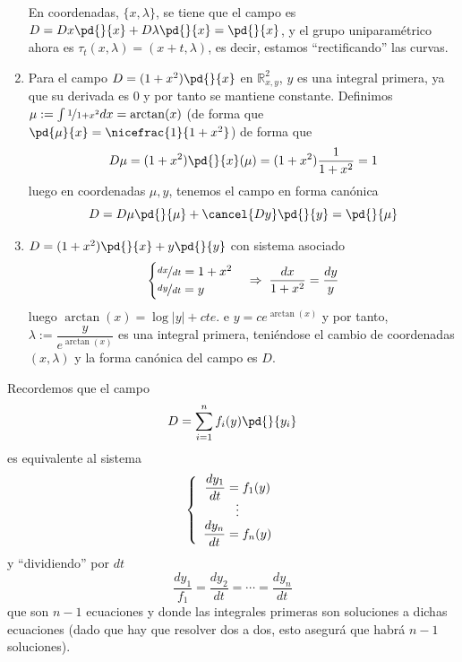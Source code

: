 \begin{eje}
\begin{enumerate}
            En coordenadas, $\{x, \lambda\}$, se tiene que el campo es $D=Dx\pd{}{x}+D\lambda \pd{}{x}=\pd{}{x}$, y el grupo uniparamétrico ahora es $\tau_t (x,\lambda)=(x+t, \lambda)$, es decir, estamos ``rectificando'' las curvas.

            \item Para el campo $D=(1+x^2)\pd{}{x}$ en $\mathbb R^2_{x,y}$, $y$ es una integral primera, ya que su derivada es 0 y por tanto se mantiene constante. Definimos $\mu:=\int \nicefrac{1}{1+x^2} dx = \arctan(x)$ (de forma que $\pd{\mu}{x}=\nicefrac{1}{1+x^2}$) de forma que 
            $$D\mu=(1+x^2)\pd{}{x}(\mu )=(1+x^2)\dfrac{1}{1+x^2}=1$$
            luego en coordenadas $\mu, y$, tenemos el campo en forma canónica
            $$D=D\mu\pd{}{\mu}+\cancel{Dy}\pd{}{y}=\pd{}{\mu}$$
            \item $D=(1+x^2)\pd{}{x}+y\pd{}{y}$ con sistema asociado
            $$\begin{cases}
                \nicefrac{dx}{dt}=1+x^2 \\ \nicefrac{dy}{dt}=y
            \end{cases}  \Rightarrow \; \dfrac{dx}{1+x^2}=\dfrac{dy}{y} $$
            luego $\arctan(x)=\log|y|+cte.$ e $y=c e^{\arctan (x)}$ y por tanto, $\lambda:=\dfrac{y}{e^{\arctan(x)}}$ es una integral primera, teniéndose el cambio de coordenadas $(x,\lambda)$ y la forma canónica del campo es $D$.
        \end{enumerate}
    \end{eje}
    \begin{prop}
        Recordemos que el campo
        $$D=\sum_{i=1}^{n} f_i(y) \pd{}{y_i}$$
        es equivalente al sistema
        $$\left\{ \begin{array}{cc}
             \dfrac{dy_1}{dt}=f_1(y)  \\
             \vspace{-5mm} \\
             \vdots \\
             \dfrac{dy_n}{dt}=f_n(y)
        \end{array} \right.$$
        y ``dividiendo'' por $dt$
        $$\dfrac{dy_1}{f_1}=\dfrac{dy_2}{dt}=\cdots = \dfrac{dy_n}{dt}$$
        que son $n-1$ ecuaciones y donde las integrales primeras son soluciones a dichas ecuaciones (dado que hay que resolver dos a dos, esto asegurá que habrá $n-1$ soluciones).
    \end{prop}
